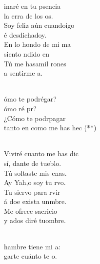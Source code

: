 \documentclass[12pt]{article}
\begin{document}
\begin{multicols*}{2}
\begin{cancion}%
	inaré en tu psencia \\
	 la erra de los os.\\
	Soy feliz aún cuandoigo \\
	é desdichadoy.\\
	En lo hondo de mi ma \\
	siento ndido en   \\
	Tú me hasamil rones \\
	a sentirme a. \\\jump\\
	\begin{chorus}%
	ómo te podrégar?\\
	ómo ré pr?\\
	¿Cómo te podrpagar \\
	tanto en como me has hec (**)\\
	\end{chorus}%
	\jump\\
	Viviré cuanto me has dic \\
	sí, dante de tueblo.\\
	Tú soltaste mis cnas.\\
	Ay Yah,o soy tu rvo. \\
	Tu siervo para rvir \\
	á doe exista unmbre.\\
	Me ofrece sacricio  \\
	y ados diré tuombre.\\\jump\\
	\begin{chorus}%
	hambre tiene mi a:\\
	garte cuánto te o.\\

\end{chorus}
\end{cancion}
\end{multicols*}
\end{document}
